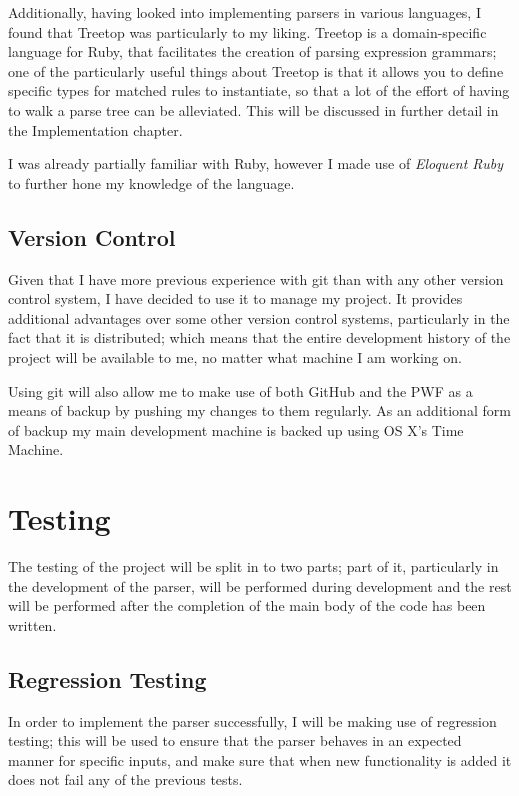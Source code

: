     Additionally, having looked into implementing parsers in various languages,
    I found that Treetop\cite{website:treetop} was particularly to my liking.
    Treetop is a domain-specific language for Ruby, that facilitates the
    creation of parsing expression grammars; one of the particularly useful
    things about Treetop is that it allows you to define specific types for
    matched rules to instantiate, so that a lot of the effort of having to walk
    a parse tree can be alleviated. This will be discussed in further detail in
    the Implementation chapter.

    I was already partially familiar with Ruby, however I made use of
    \emph{Eloquent Ruby}\cite{book:eloquent_ruby} to further hone my knowledge
    of the language.
  \subsection{Version Control}
    Given that I have more previous experience with git than with any other
    version control system, I have decided to use it to manage my project. It
    provides additional advantages over some other version control systems,
    particularly in the fact that it is distributed; which means that the entire
    development history of the project will be available to me, no matter what
    machine I am working on.

    Using git will also allow me to make use of both GitHub and the PWF as a
    means of backup by pushing my changes to them regularly. As an additional
    form of backup my main development machine is backed up using OS X's Time
    Machine.

\section{Testing}
The testing of the project will be split in to two parts; part of it,
particularly in the development of the parser, will be performed during
development and the rest will be performed after the completion of the main
body of the code has been written.

  \subsection{Regression Testing}
    In order to implement the parser successfully, I will be making use of
    regression testing; this will be used to ensure that the parser behaves
    in an expected manner for specific inputs, and make sure that when new
    functionality is added it does not fail any of the previous tests.

